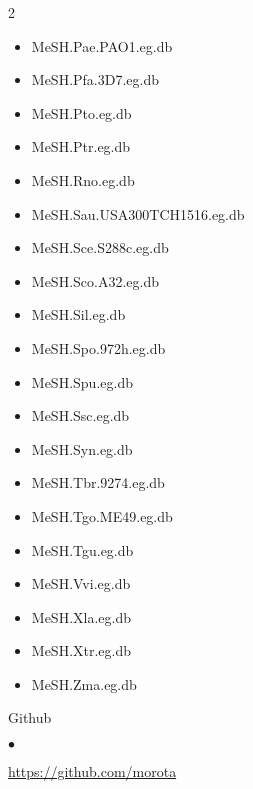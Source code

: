 \documentclass[margin,line,10pt]{res}
\newenvironment{list1}{
  \begin{list}{\ding{113}}{%
      \setlength{\itemsep}{0in}
      \setlength{\parsep}{0in} \setlength{\parskip}{0in}
      \setlength{\topsep}{0in} \setlength{\partopsep}{0in} 
      \setlength{\leftmargin}{0.17in}}}{\end{list}}
\newenvironment{list2}{
  \begin{list}{$\bullet$}{%
      \setlength{\itemsep}{0in}
      \setlength{\parsep}{0in} \setlength{\parskip}{0in}
      \setlength{\topsep}{0in} \setlength{\partopsep}{0in} 
      \setlength{\leftmargin}{0.2in}}}{\end{list}}
\begin{document}
\begin{resume}
\begin{list1}
\begin{multicols}{2}
\begin{itemize}
\item MeSH.Pae.PAO1.eg.db 
\item MeSH.Pfa.3D7.eg.db
\item MeSH.Pto.eg.db 
\item MeSH.Ptr.eg.db 
\item MeSH.Rno.eg.db  
\item MeSH.Sau.USA300TCH1516.eg.db 
\item MeSH.Sce.S288c.eg.db 
\item MeSH.Sco.A32.eg.db 
\item MeSH.Sil.eg.db 
\item MeSH.Spo.972h.eg.db
\item MeSH.Spu.eg.db
\item MeSH.Ssc.eg.db 
\item MeSH.Syn.eg.db 
\item MeSH.Tbr.9274.eg.db 
\item MeSH.Tgo.ME49.eg.db
\item MeSH.Tgu.eg.db 
\item MeSH.Vvi.eg.db 
\item MeSH.Xla.eg.db  
\item MeSH.Xtr.eg.db 
\item MeSH.Zma.eg.db
\end{itemize}
\end{multicols}



\vspace{0.3cm}
\item[] Github
\begin{list2}
\item \textcolor{blue}{\href{https://github.com/morota}{https://github.com/morota}} 
\end{list2}
\end{list1}










\end{resume}
\end{document}
